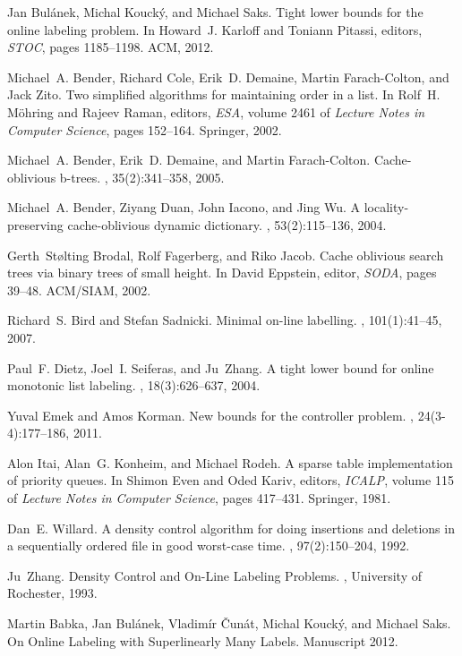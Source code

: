 \documentclass[runningheads,a4paper]{llncs}
\begin{document}
\newcommand{\etalchar}[1]{$^{#1}$}
\begin{thebibliography}{32}

Jan Bul{\'a}nek, Michal Kouck{\'y}, and Michael Saks.
\newblock Tight lower bounds for the online labeling problem.
\newblock In Howard~J. Karloff and Toniann Pitassi, editors, {\em STOC}, pages 1185--1198. ACM, 2012.

Michael~A. Bender, Richard Cole, Erik~D. Demaine, Martin Farach-Colton, and Jack Zito.
\newblock Two simplified algorithms for maintaining order in a list.
\newblock In Rolf~H. M{\"o}hring and Rajeev Raman, editors, {\em ESA}, volume 2461 of {\em Lecture Notes in Computer Science}, pages 152--164. Springer, 2002.

Michael~A. Bender, Erik~D. Demaine, and Martin Farach-Colton.
\newblock Cache-oblivious b-trees.
, 35(2):341--358, 2005.

Michael~A. Bender, Ziyang Duan, John Iacono, and Jing Wu.
\newblock A locality-preserving cache-oblivious dynamic dictionary.
, 53(2):115--136, 2004.

Gerth~St{\o}lting Brodal, Rolf Fagerberg, and Riko Jacob.
\newblock Cache oblivious search trees via binary trees of small height.
\newblock In David Eppstein, editor, {\em SODA}, pages 39--48. ACM/SIAM, 2002.

Richard~S. Bird and Stefan Sadnicki.
\newblock Minimal on-line labelling.
, 101(1):41--45, 2007.

Paul~F. Dietz, Joel~I. Seiferas, and Ju~Zhang.
\newblock A tight lower bound for online monotonic list labeling.
, 18(3):626--637, 2004.


Yuval Emek and Amos Korman.
\newblock New bounds for the controller problem.
, 24(3-4):177--186, 2011.

Alon Itai, Alan~G. Konheim, and Michael Rodeh.
\newblock A sparse table implementation of priority queues.
\newblock In Shimon Even and Oded Kariv, editors, {\em ICALP}, volume 115 of {\em Lecture Notes in Computer Science}, pages 417--431. Springer, 1981.

Dan~E. Willard.
\newblock A density control algorithm for doing insertions and deletions in a sequentially ordered file in good worst-case time.
, 97(2):150--204, 1992.

Ju~Zhang.
\newblock Density Control and On-Line Labeling Problems.
, University of Rochester, 1993.

{Martin Babka, Jan Bul\'{a}nek, Vladim\'{i}r \v{C}un\'{a}t, Michal Kouck\'{y}, and Michael Saks}.
\newblock On Online Labeling with Superlinearly Many Labels.
\newblock Manuscript 2012.
\end{thebibliography}
\end{document}
